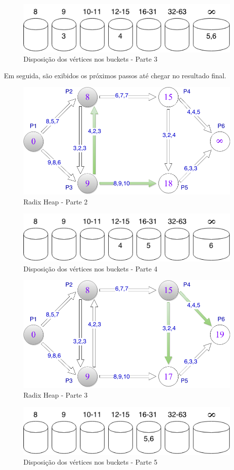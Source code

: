 \begin{figure}[htbp]
\centering
 \includegraphics[width=.50\textwidth]{chapters/fig/buckets3.png}
\caption{Disposição dos vértices nos buckets - Parte 3}
\label{fig:buckets3}
\end{figure}
\FloatBarrier

Em seguida, são exibidos os próximos passos até chegar no resultado final.
\begin{figure}[htbp]
\centering
 \includegraphics[width=.50\textwidth]{chapters/fig/limitesup2.png}
\caption{Radix Heap - Parte 2}
\label{fig:limitesup2}
\end{figure}

\begin{figure}[htbp]
\centering
 \includegraphics[width=.50\textwidth]{chapters/fig/buckets4.png}
\caption{Disposição dos vértices nos buckets - Parte 4}
\label{fig:buckets4}
\end{figure}
\FloatBarrier

\begin{figure}[htbp]
\centering
 \includegraphics[width=.50\textwidth]{chapters/fig/limitesup3.png}
\caption{Radix Heap - Parte 3}
\label{fig:limitesup3}
\end{figure}

\begin{figure}[htbp]
\centering
 \includegraphics[width=.50\textwidth]{chapters/fig/buckets5.png}
\caption{Disposição dos vértices nos buckets - Parte 5}
\label{fig:buckets5}
\end{figure}
\FloatBarrier

